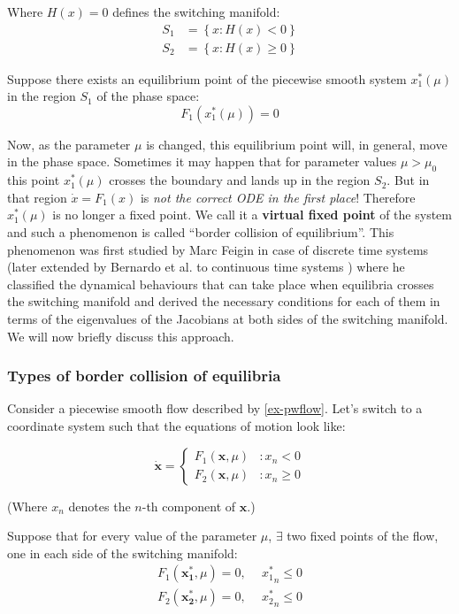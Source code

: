 \documentclass{book}
\renewcommand{\(}{\begin{columns}}
\renewcommand{\)}{\end{columns}}
\newcommand{\<}[1]{\begin{column}{#1}}
\renewcommand{\>}{\end{column}}
\newcommand{\bb}[1]{\textbf{#1}}
\newcommand{\mb}[1]{\mathbf{#1}}
\begin{document}
Where $H(x)=0$ defines the switching manifold:
\begin{align*}
S_1&=\left\{x:H(x)<0\right\}\\
S_2&=\left\{x:H(x)\geq0\right\}
\end{align*}

Suppose there exists an equilibrium point of the 
piecewise smooth system $x_1^*(\mu)$ in the region $S_1$ of the phase space:
\[
F_1(x_1^*(\mu))=0
\]


Now, as the parameter $\mu$ is changed, this equilibrium point will, in general, move in the phase 
space.  Sometimes it may happen that for parameter values $\mu>\mu_0$ this point $x_1^*(\mu)$ crosses the 
boundary and lands up in the region $S_2$.  But in that region $\dot{x}=F_1(x)$ 
is \emph{not the correct ODE in the first place}! Therefore $x_1^*(\mu)$ is no longer 
a fixed point.  We call it a \bb{virtual fixed point}  of the system and such a phenomenon is called 
``border collision of equilibrium''. This phenomenon was first studied by Marc 
Feigin in case of discrete time systems \cite{feigin-1999}(later extended by 
Bernardo et al. to continuous time systems \cite{bernardo-c-cases}) where he classified the dynamical 
behaviours that can take place when equilibria crosses the switching manifold and 
 derived the necessary conditions for each of them in
terms of the eigenvalues of the Jacobians at both sides of the switching 
manifold. We will now briefly discuss this approach.  

\subsubsection{Types of border collision of equilibria}
Consider a piecewise smooth flow described by \eqref{ex-pwflow}. Let's switch 
to a coordinate system such that the equations of motion look like:

\begin{equation}
\label{ex-pwflow_normal}
   \dot{\mathbf{x}} = \left\{
     \begin{array}{lr}
       F_1(\mathbf{x},\mu) & : x_n<0\\
       F_2(\mathbf{x},\mu) & : x_n\geq0
     \end{array}
   \right.
\end{equation}

(Where $x_n$ denotes the $n$-th component of $\mathbf{x}$.)

Suppose that for every value of the parameter $\mu$, $\exists$ two fixed 
points of the flow, one in each side of the switching manifold:
\begin{align}
\label{def-2fps}
F_1(\mb{x_1^*},\mu)=0,&~~{x_1^*}_n\leq 0\\
F_2(\mb{x_2^*},\mu)=0,&~~{x_2^*}_n\leq 0
\end{align}
\end{document}
